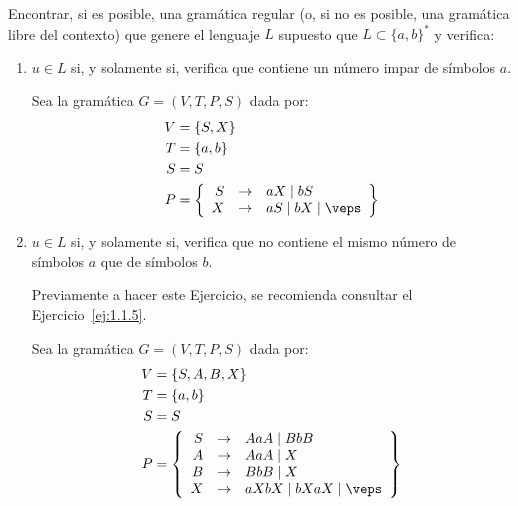 \begin{ejercicio}
    Encontrar, si es posible, una gramática regular (o, si no es posible, una gramática libre del contexto) que genere el lenguaje $L$ supuesto que $L \subset \{a, b\}^\ast$ y verifica:
    \begin{enumerate}
        \item $u \in L$ si, y solamente si, verifica que contiene un número impar de símbolos $a$.
        
        Sea la gramática $G=\left(V,T,P,S\right)$ dada por:
        \begin{align*}
            V &= \{S, X\} \\
            T &= \{a,b\} \\
            S &= S \\
            P &= \left\{
                \begin{array}{rcl}
                    S &\rightarrow & aX \mid bS\\
                    X &\rightarrow & aS \mid bX \mid \veps
                \end{array}
            \right\}
        \end{align*}
        \item $u \in L$ si, y solamente si, verifica que no contiene el mismo número de símbolos $a$ que de símbolos $b$.
        
        Previamente a hacer este Ejercicio, se recomienda consultar el Ejercicio~\ref{ej:1.1.5}.
        
        Sea la gramática $G=\left(V,T,P,S\right)$ dada por:
        \begin{align*}
            V &= \{S, A, B, X\} \\
            T &= \{a,b\} \\
            S &= S \\
            P &= \left\{
                \begin{array}{rcl}
                    S &\rightarrow & AaA \mid BbB \\
                    A &\rightarrow & AaA\mid X \\
                    B &\rightarrow & BbB \mid X \\
                    X &\rightarrow & aXbX \mid bXaX \mid \veps
                \end{array}
            \right\}
        \end{align*}
    \end{enumerate}
\end{ejercicio}


